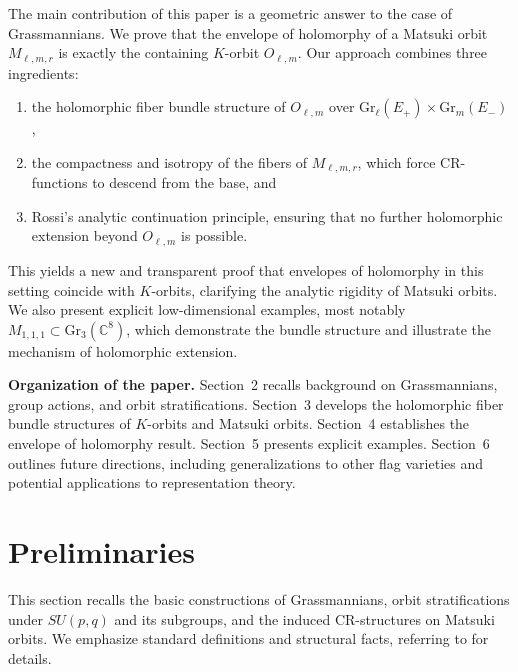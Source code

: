 \documentclass[12pt,a4paper]{article}
\theoremstyle{plain}
\theoremstyle{definition}
\theoremstyle{remark}
\begin{document}
The main contribution of this paper is a geometric answer to the case of 
Grassmannians. 
We prove that the envelope of holomorphy of a Matsuki orbit $M_{\ell,m,r}$ 
is exactly the containing $K$-orbit $O_{\ell,m}$. 
Our approach combines three ingredients:
\begin{enumerate}
    \item the holomorphic fiber bundle structure of $O_{\ell,m}$ over 
    $\mathrm{Gr}_{\ell}(E_+) \times \mathrm{Gr}_{m}(E_-)$,
    \item the compactness and isotropy of the fibers of $M_{\ell,m,r}$, 
    which force CR-functions to descend from the base, and 
    \item Rossi’s analytic continuation principle, ensuring that no further 
    holomorphic extension beyond $O_{\ell,m}$ is possible. 
\end{enumerate}

This yields a new and transparent proof that envelopes of holomorphy in this 
setting coincide with $K$-orbits, clarifying the analytic rigidity of Matsuki 
orbits. 
We also present explicit low-dimensional examples, most notably 
$M_{1,1,1}\subset \mathrm{Gr}_3(\mathbb{C}^8)$, which demonstrate the bundle 
structure and illustrate the mechanism of holomorphic extension.

\smallskip
\noindent\textbf{Organization of the paper.}
Section~2 recalls background on Grassmannians, group actions, and orbit 
stratifications. 
Section~3 develops the holomorphic fiber bundle structures of $K$-orbits and 
Matsuki orbits. 
Section~4 establishes the envelope of holomorphy result. 
Section~5 presents explicit examples. 
Section~6 outlines future directions, including generalizations to other flag 
varieties and potential applications to representation theory. 


\section{Preliminaries}

This section recalls the basic constructions of Grassmannians, orbit 
stratifications under $SU(p,q)$ and its subgroups, and the induced 
CR-structures on Matsuki orbits. 
We emphasize standard definitions and structural facts, referring to 
\cite{GriffithsHarris1978,Hel2001,FelsHuckleberryWolf2006} for details.
\end{document}
